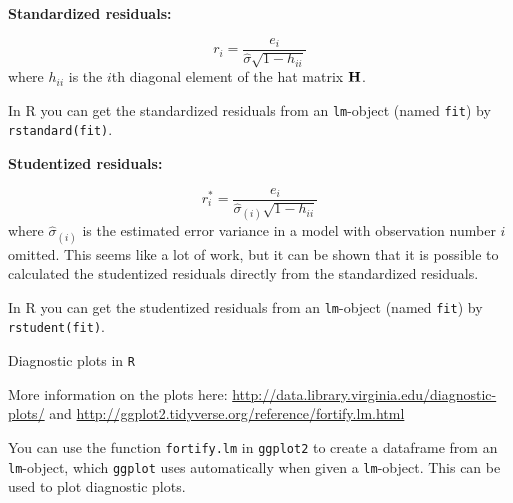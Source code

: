 \documentclass[10pt,ignorenonframetext,]{beamer}
\begin{document}
\begin{frame}[fragile]

\textbf{Standardized residuals:}

\[r_i=\frac{e_i}{\hat{\sigma}\sqrt{1-h_{ii}}}\] where \(h_{ii}\) is the
\(i\)th diagonal element of the hat matrix \({\bf H}\).

In R you can get the standardized residuals from an \texttt{lm}-object
(named \texttt{fit}) by \texttt{rstandard(fit)}.

\textbf{Studentized residuals:}

\[r^*_i=\frac{e_i}{\hat{\sigma}_{(i)}\sqrt{1-h_{ii}}}\] where
\(\hat{\sigma}_{(i)}\) is the estimated error variance in a model with
observation number \(i\) omitted. This seems like a lot of work, but it
can be shown that it is possible to calculated the studentized residuals
directly from the standardized residuals.

In R you can get the studentized residuals from an \texttt{lm}-object
(named \texttt{fit}) by \texttt{rstudent(fit)}.

\end{frame}

\begin{frame}[fragile]

\begin{block}{Diagnostic plots in \texttt{R}}

More information on the plots here:
\url{http://data.library.virginia.edu/diagnostic-plots/} and
\url{http://ggplot2.tidyverse.org/reference/fortify.lm.html}

You can use the function \texttt{fortify.lm} in \texttt{ggplot2} to
create a dataframe from an \texttt{lm}-object, which \texttt{ggplot}
uses automatically when given a \texttt{lm}-object. This can be used to
plot diagnostic plots.

\end{block}

\end{frame}
\end{document}

